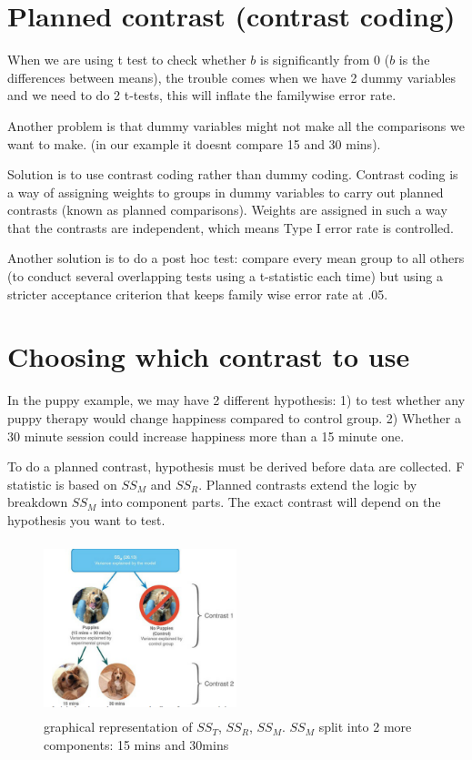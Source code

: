 \section{Planned contrast (contrast coding)}
When we are using t test to check whether $b$ is significantly from 0 ($b$ is the differences between means), the trouble comes when we have 2 dummy variables and we need to do 2 t-tests, this will inflate the familywise error rate. 

Another problem is that dummy variables might not make all the comparisons we want to make. (in our example it doesnt compare 15 and 30 mins).

Solution is to use contrast coding rather than dummy coding. Contrast coding is a way of assigning weights to groups in dummy variables to carry out planned contrasts (known as planned comparisons). Weights are assigned in such a way that the contrasts are independent, which means Type I error rate is controlled. 

Another solution is to do a post hoc test: compare every mean group to all others (to conduct several overlapping tests using a t-statistic each time) but using a stricter acceptance criterion that keeps family wise error rate at .05. 

\section{Choosing which contrast to use}
In the puppy example, we may have 2 different hypothesis: 1) to test whether any puppy therapy would change happiness compared to control group. 2) Whether a 30 minute session could increase happiness more than a 15 minute one. 

To do a planned contrast, hypothesis must be derived before data are collected. F statistic is based on $SS_M$ and $SS_R$. Planned contrasts extend the logic by breakdown $SS_M$ into component parts. The exact contrast will depend on the hypothesis you want to test. 

\begin{figure}[h]
	\includegraphics[width=0.5\textwidth,height=50mm]{Chapter 12 GLM 1 Comparing Several Independent Means ANOVA/plannedcontrast.PNG}
	\caption{graphical representation of $SS_T$, $SS_R$,  $SS_M$. $SS_M$ split into 2 more components: 15 mins and 30mins}
\end{figure}



